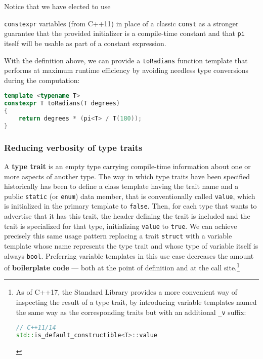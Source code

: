 \noindent Notice that we have elected to use {\texttt{constexpr} variables 
(from C++11) in place of a classic \texttt{const} as a stronger
guarantee that the provided initializer is a compile-time constant and
that \texttt{pi} itself will be usable as part of a constant expression.

With the definition above, we can provide a
\texttt{toRadians} function template that performs at maximum runtime
efficiency by avoiding needless type conversions during the computation:

\begin{lstlisting}[language=C++]
template <typename T>
constexpr T toRadians(T degrees)
{
    return degrees * (pi<T> / T(180));
}
\end{lstlisting}
    

\subsubsection[Reducing verbosity of type traits]{Reducing verbosity of type traits}\label{reducing-verbosity-of-type-traits}

A \textbf{type trait} is an empty type carrying compile-time information
about one or more aspects of another type. The way in which type traits
have been specified historically has been to define a class template
having the trait name and a public \texttt{static} (or \texttt{enum})
data member, that is conventionally called \texttt{value}, which is
initialized in the primary template to \texttt{false}. Then, for each
type that wants to advertise that it has this trait, the header defining
the trait is included and the trait is specialized for that type,
initializing \texttt{value} to \texttt{true}. We can achieve precisely
this same usage pattern replacing a trait \texttt{struct} with a
variable template whose name represents the type trait and whose type of
variable itself is always \texttt{bool}. Preferring variable templates
in this use case decreases the amount of \textbf{boilerplate code} ---
both at the point of definition and at the call
site.{\cprotect\footnote{As of C++17, the Standard Library provides a
more convenient way of inspecting the result of a type trait, by
introducing variable templates named the same way as the corresponding
traits but with an additional \texttt{\_v} suffix:

\begin{lstlisting}[language=C++, basicstyle={\ttfamily\footnotesize}]
// C++11/14
std::is_default_constructible<T>::value


\end{lstlisting}}}}

